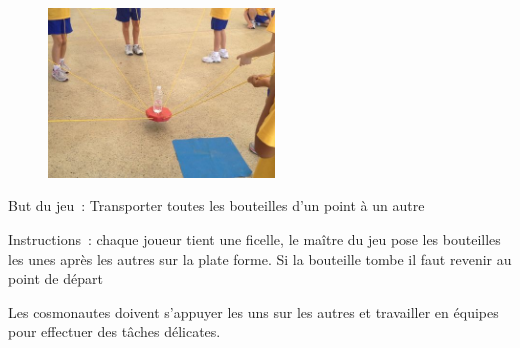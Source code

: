 \documentclass{grand-jeu}
\begin{document}
\begin{liste-materiel}
\end{liste-materiel}

\begin{regles}
\begin{figure}
\vspace{-1cm}
\includegraphics[width=6cm]{4-Solidaire-rouge/sources/81.jpg}
\end{figure}

But du jeu : Transporter toutes les bouteilles d’un point à un autre

\vspace{0.2cm}

Instructions : chaque joueur tient une ficelle, le maître du jeu pose les bouteilles les unes après les autres sur la plate forme. Si la bouteille tombe il faut revenir au point de départ 
\end{regles}

\begin{imaginaire}
Les cosmonautes doivent s'appuyer les uns sur les autres et travailler en équipes pour effectuer des tâches délicates. 
\end{imaginaire}

\begin{moments-stop}
\end{moments-stop}
\end{document}
